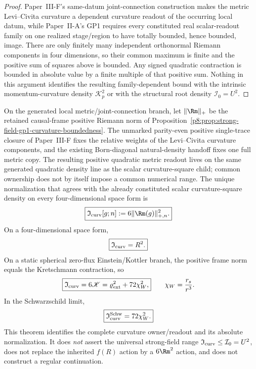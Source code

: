 \documentclass[12pt,a4paper]{article}
\begin{document}
\begin{proof}
Paper~III-F's same-datum joint-connection construction makes the metric
Levi--Civita curvature a dependent curvature readout of the occurring local
datum, while Paper~II-A's GP1 requires every constituted real scalar-readout
family on one realized stage/region to have totally bounded, hence bounded,
image.  There are only finitely many independent orthonormal Riemann
components in four dimensions, so their common maximum is finite and the
positive sum of squares above is bounded.  Any signed quadratic contraction
is bounded in absolute value by a finite multiple of that positive sum.
Nothing in this argument identifies the resulting family-dependent bound with
the intrinsic momentum-curvature density \(\mathcal K_p^2\) or with the
structural root density \(\mathcal I_0=U^2\).
\end{proof}

\begin{theorem}
\label{p8:thm:complete-four-curvature-owner}
On the generated local metric/joint-connection branch, let
\(\lVert\Rm\rVert_+\) be the retained causal-frame positive Riemann norm
of Proposition~\ref{p8:prop:strong-field-gp1-curvature-boundedness}.  The
unmarked parity-even positive single-trace closure of Paper~III-F fixes the
relative weights of the Levi--Civita curvature components, and the existing
Born-diagonal natural-density handoff fixes one full metric copy.  The resulting positive quadratic metric readout lives on the same generated
quadratic density line as the scalar curvature-square child; common ownership
does not by itself impose a common numerical range.  The unique normalization
that agrees with the already constituted scalar curvature-square density on
every four-dimensional space form is
\begin{equation}
\label{p8:eq:complete-four-curvature-owner}
 \boxed{\mathfrak I_{\rm curv}[g;n]
 :=6\lVert\Rm(g)\rVert_{+,n}^{2}.}
\end{equation}
On a four-dimensional space form,
\begin{equation}
\label{p8:eq:complete-four-curvature-spaceform}
 \boxed{\mathfrak I_{\rm curv}=R^2.}
\end{equation}
On a static spherical zero-flux Einstein/Kottler branch, the positive frame
norm equals the Kretschmann contraction, so
\begin{equation}
\label{p8:eq:complete-four-curvature-kottler}
 \boxed{\mathfrak I_{\rm curv}=6\mathscr K
 =\varrho_{\rm ext}^{2}+72\chi_W^2,}
 \qquad \chi_W=\frac{r_s}{r^3}.
\end{equation}
In the Schwarzschild limit,
\begin{equation}
\label{p8:eq:complete-four-curvature-schwarzschild}
 \boxed{\mathfrak I_{\rm curv}^{\rm Schw}=72\chi_W^2.}
\end{equation}
This theorem identifies the complete curvature owner/readout and its absolute
normalization.  It does \emph{not} assert the universal strong-field range
\(\mathfrak I_{\rm curv}\le\mathcal I_0=U^2\), does not replace the
inherited \(f(R)\) action by a \(6\Rm^2\) action, and does not construct a
regular continuation.
\end{theorem}
\end{document}
